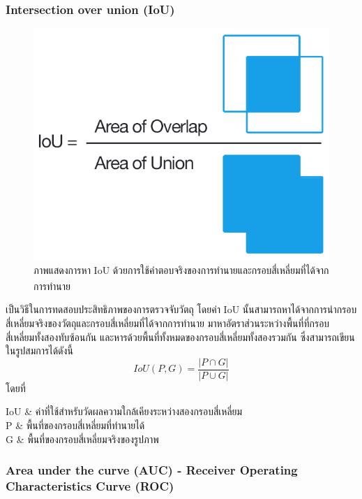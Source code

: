 \subsubsection{Intersection over union (IoU)}
\begin{figure}[!ht]
	\centering
	\includegraphics[scale=0.3]{chapter2/images/iou_equation.png}
		\caption[ภาพแสดงการหา IoU ด้วยการใช้คำตอบจริงของการทำนายและกรอบสี่เหลี่ยมที่ได้จากการทำนาย]{ภาพแสดงการหา IoU ด้วยการใช้คำตอบจริงของการทำนายและกรอบสี่เหลี่ยมที่ได้จากการทำนาย\textsuperscript{\cite{iou_pic}}}
    	\label{fig:iou_equation}
\end{figure}
เป็นวิธีในการทดสอบประสิทธิภาพของการตรวจจับวัตถุ โดยค่า IoU นั้นสามารถหาได้จากการนำกรอบสี่เหลี่ยมจริงของวัตถุและกรอบสี่เหลี่ยมที่ได้จากการทำนาย
มาหาอัตราส่วนระหว่างพื้นที่ที่กรอบสี่เหลี่ยมทั้งสองทับซ้อนกัน และหารด้วยพื้นที่ทั้งหมดของกรอบสี่เหลี่ยมทั้งสองรวมกัน ซึ่งสามารถเขียนในรูปสมการได้ดังนี้
\begin{equation}
IoU(P,G) = \frac{\left| P \cap G \right|}{\left| P \cup  G \right|}					
\end{equation}
โดยที่
\begin{conditions}
IoU			&  ค่าที่ใช้สำหรับวัดผลความใกล้เคียงระหว่างสองกรอบสี่เหลี่ยม    \\
P			&  พื้นที่ของกรอบสี่เหลี่ยมที่ทำนายได้	\\
G			&  พื้นที่ของกรอบสี่เหลี่ยมจริงของรูปภาพ					\\
\end{conditions}

\subsubsection{Area under the curve (AUC) - Receiver Operating Characteristics Curve (ROC)}



